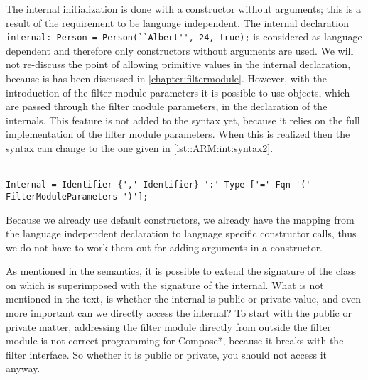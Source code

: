 The internal initialization is done with a constructor without arguments; this is a result of the requirement to be language independent. 
The internal declaration \lstinline!internal: Person = Person(``Albert'', 24, true);! is considered as language dependent and therefore only constructors without arguments are used. 
We will not re-discuss the point of allowing primitive values in the internal declaration, because is has been discussed in \autoref{chapter:filtermodule}.
However, with the introduction of the filter module parameters it is possible to use objects, which are passed through the filter module parameters, in the declaration of the internals.
This feature is not added to the syntax yet, because it relies on the full implementation of the filter module parameters. 
When this is realized then the syntax can change to the one given in \autoref{lst::ARM:int:syntax2}.
\\\\
\begin{lstlisting}[caption = {Proposed internal syntax}, label = lst::ARM:int:syntax2,
style = listing, language = ebnf]
Internal = Identifier {',' Identifier} ':' Type ['=' Fqn '(' FilterModuleParameters ')'];
\end{lstlisting}
Because we already use default constructors, we already have the mapping from the language independent declaration to language specific constructor calls, thus we do not have to work them out for adding arguments in a constructor.

As mentioned in the semantics, it is possible to extend the signature of the class on which is superimposed with the signature of the internal. 
What is not mentioned in the text, is whether the internal is public or private value, and even more important can we directly access the internal?
To start with the public or private matter, addressing the filter module directly from outside the filter module is not correct programming for Compose*, because it breaks with the filter interface. 
So whether it is public or private, you should not access it anyway.

